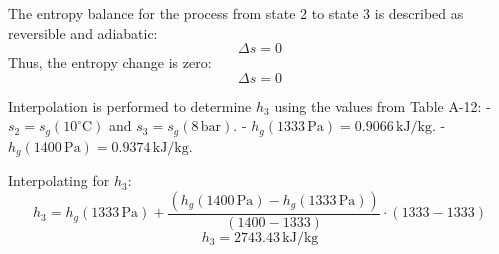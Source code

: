 The entropy balance for the process from state 2 to state 3 is described as reversible and adiabatic:  
\[
\Delta s = 0
\]  
Thus, the entropy change is zero:  
\[
\Delta s = 0
\]

Interpolation is performed to determine \( h_3 \) using the values from Table A-12:  
- \( s_2 = s_g(10^\circ\text{C}) \) and \( s_3 = s_g(8 \, \text{bar}) \).  
- \( h_g(1333 \, \text{Pa}) = 0.9066 \, \text{kJ/kg} \).  
- \( h_g(1400 \, \text{Pa}) = 0.9374 \, \text{kJ/kg} \).  

Interpolating for \( h_3 \):  
\[
h_3 = h_g(1333 \, \text{Pa}) + \frac{(h_g(1400 \, \text{Pa}) - h_g(1333 \, \text{Pa}))}{(1400 - 1333)} \cdot (1333 - 1333)
\]  
\[
h_3 = 2743.43 \, \text{kJ/kg}
\]